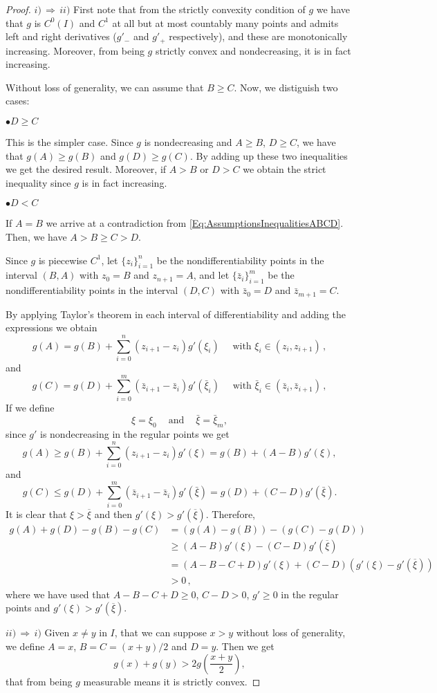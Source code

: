 \begin{proof}
$i)\, \Rightarrow \,ii)$
First note that from the strictly convexity condition of $g$ we have that $g$ is $C^0(I)$ and $C^1$ at all but at most countably many points and admits left and right derivatives ($g'_-$ and $g'_+$ respectively), and these are monotonically increasing. Moreover, from being $g$ strictly convex and nondecreasing, it is in fact increasing.

Without loss of generality, we can assume that $B \geq C$. Now, we distiguish two cases:

$\bullet D \geq C$

This is the simpler case. Since $g$ is nondecreasing and $A \geq B$, $D \geq C$, we have that $g(A) \geq g(B)$ and $g(D) \geq g(C)$. By adding up these two inequalities we get the desired result. Moreover, if $A>B$ or $D>C$ we obtain the strict inequality since $g$ is in fact increasing.

$\bullet D < C$

If $A = B$ we arrive at a contradiction from \eqref{Eq:AssumptionsInequalitiesABCD}. Then, we have $A > B \geq C > D$.

Since $g$ is piecewise $C^1$, let $\{z_i\}_{i=1}^{n}$ be the nondifferentiability points in the interval $(B,A)$ with $z_0 = B$ and $z_{n+1}=A$, and let $\{\bar{z}_i\}_{i=1}^{m}$ be the nondifferentiability points in the interval $(D,C)$ with $\bar{z}_0 = D$ and $\bar{z}_{m+1}=C$.

By applying Taylor's theorem in each interval of differentiability and adding the expressions we obtain
$$
g(A) = g(B) + \sum_{i=0}^{n}(z_{i+1}-z_i) g'(\xi_i) \quad \textrm{ with } \xi_i \in (z_i,z_{i+1})\,,
$$
and
$$
g(C) = g(D) + \sum_{i=0}^{m}(\bar{z}_{i+1}-\bar{z}_i) g'(\bar{\xi}_i) \quad \textrm{ with } \bar{\xi}_i \in (\bar{z}_i,\bar{z}_{i+1})\,,
$$
If we define
$$ \xi = \xi_0 \ \ \ \ \textrm{ and } \ \ \ \ \bar{\xi} = \bar{\xi}_m
,$$
since $g'$ is nondecreasing in the regular points we get
$$
g(A) \geq g(B) + \sum_{i=0}^{n}(z_{i+1}-z_i) g'(\xi) = g(B) + (A-B)g'(\xi),
$$
and
$$
g(C) \leq g(D) + \sum_{i=0}^{m}(\bar{z}_{i+1}-\bar{z}_i) g'(\bar{\xi}) = g(D)+(C-D)g'(\bar{\xi}).
$$
It is clear that $\xi > \overline{\xi}$ and then $g'(\xi) > g'(\overline{\xi})$. Therefore,
\begin{align*}
g(A) + g(D) - g(B) - g(C) &= (g(A) - g(B)) - (g(C) - g(D)) \\
&\geq (A - B)g'(\xi)  - (C - D)g'(\overline{\xi}) \\
&= (A - B - C + D)g'(\xi) + (C - D) (g'(\xi) - g'(\overline{\xi}))\\
& > 0\,,
\end{align*}
where we have used that $A - B - C + D \geq 0$, $C - D > 0$, $g'\geq 0$ in the regular points and $g'(\xi) > g'(\overline{\xi})$.

$ii)\, \Rightarrow \,i)$ Given $x\neq y$ in $I$, that we can suppose $x>y$ without loss of generality, we define $A=x$, $B=C=(x+y)/2$ and $D=y$. Then we get
$$ g(x)+g(y) > 2g\left( \frac{x+y}{2} \right), $$
that from being $g$ measurable means it is strictly convex.
\end{proof}

